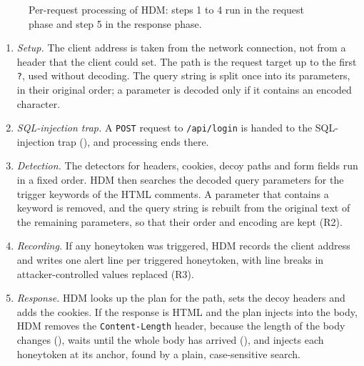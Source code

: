 \documentclass{rptuma}
\begin{document}
\begin{figure}[htbp]
\caption{Per-request processing of HDM: steps 1 to 4 run in the request phase and step 5 in the response phase.}
\label{fig:design.flow}
\end{figure}
\begin{enumerate}
  \item \emph{Setup.} The client address is taken from the network connection, not from a header
    that the client could set. The path is the request target up to the first \texttt{?}, used
    without decoding. The query string is split once into its parameters, in their original order;
    a parameter is decoded only if it contains an encoded character.
  \item \emph{SQL-injection trap.} A \texttt{POST} request to \texttt{/api/login} is handed to the SQL-injection trap
    (), and processing ends there.
  \item \emph{Detection.} The detectors for headers, cookies, decoy paths and form fields run in a
    fixed order. HDM then searches the decoded query parameters for the trigger keywords of the HTML
    comments. A parameter that contains a keyword is removed, and the query string is rebuilt from
    the original text of the remaining parameters, so that their order and encoding are kept (R2).
  \item \emph{Recording.} If any honeytoken was triggered, HDM records the client address and
    writes one alert line per triggered honeytoken, with line breaks in attacker-controlled
    values replaced (R3).
  \item \emph{Response.} HDM looks up the plan for the path, sets the decoy headers and adds the
    cookies. If the response is HTML and the plan injects into the body, HDM removes the
    \texttt{Content-Length} header, because the length of the body changes
    (), waits until the whole body has arrived
    (), and injects each honeytoken at its anchor, found by a plain,
    case-sensitive search.
\end{enumerate}
\end{document}
